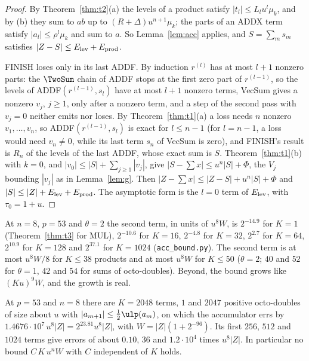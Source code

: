 \begin{proof}
By Theorem~\ref{thm:t2}(a) the levels of a product satisfy $|t_l| \le L_lu^l\mu_k$, and by (b) they sum to $a b$
up to $(R+\Delta)u^{n+1}\mu_k$; the parts of an ADDX term satisfy $|a_l| \le \rho^l\mu_k$ and sum to $a$. So
Lemma~\ref{lem:acc} applies, and $S = \sum_m s_m$ satisfies $|Z - S| \le E_{\rm lev} + E_{\rm prod}$.

FINISH loses only in its last ADDF. By induction $r^{(l)}$ has at most $l+1$ nonzero parts: the $\TwoSum$ chain of
ADDF stops at the first zero part of $r^{(l-1)}$, so the levels of ADDF$(r^{(l-1)}, s_l)$ have at most $l+1$ nonzero
terms, VecSum gives a nonzero $v_j$, $j \ge 1$, only after a nonzero term, and a step of the second pass with $v_j = 0$
neither emits nor loses. By Theorem~\ref{thm:t1}(a) a loss needs $n$ nonzero $v_1, \dots, v_n$, so ADDF$(r^{(l-1)},
s_l)$ is exact for $l \le n-1$ (for $l = n-1$, a loss would need $v_n \ne 0$, while its last term $s_n$ of VecSum is
zero), and FINISH's result is $R_n$ of the levels of the last ADDF, whose exact sum is $S$. Theorem~\ref{thm:t1}(b) with
$k = 0$, and $|v_0| \le |S| + \sum_{j \ge 1}|v_j|$, give $|S - \sum x| \le u^n|S| + \Phi$, the $V_j$ bounding
$|v_j|$ as in Lemma~\ref{lem:g}. Then $|Z - \sum x| \le |Z - S| + u^n|S| + \Phi$ and $|S| \le |Z| + E_{\rm lev} +
E_{\rm prod}$. The asymptotic form is the $l = 0$ term of $E_{\rm lev}$, with $\tau_0 = 1 + u$.
\end{proof}

At $n = 8$, $p = 53$ and $\theta = 2$ the second term, in units of $u^8W$, is $2^{-14.9}$ for $K = 1$ (Theorem~\ref{thm:t3}
for MUL), $2^{-10.6}$ for $K = 16$, $2^{-4.8}$ for $K = 32$, $2^{2.7}$ for $K = 64$, $2^{10.9}$ for $K = 128$ and $2^{37.1}$
for $K = 1024$ (\texttt{acc\_bound.py}). The second term is at most $u^8W/8$ for $K \le 38$ products and at most $u^8W$
for $K \le 50$ ($\theta = 2$; $40$ and $52$ for $\theta = 1$, $42$ and $54$ for sums of octo-doubles). Beyond, the bound
grows like $(Ku)^{9}W$, and the growth is real.

\begin{proposition}\label{prop:acc-low}
At $p = 53$ and $n = 8$ there are $K = 2048$ terms, $1$ and $2047$ positive octo-doubles of size about $u$ with
$|a_{m+1}| \le \frac12\ulp(a_m)$, on which the accumulator errs by $1.4676 \cdot 10^7\,u^8|Z| = 2^{23.81}u^8|Z|$, with
$W = |Z|(1 + 2^{-96})$. Its first $256$, $512$ and $1024$ terms give errors of about $0.10$, $36$ and $1.2 \cdot 10^4$
times $u^8|Z|$. In particular no bound $C\,K\,u^nW$ with $C$ independent of $K$ holds.
\end{proposition}

